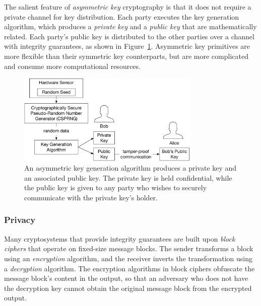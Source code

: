 The salient feature of \textit{asymmetric key} cryptography is that it does not
require a private channel for key distribution. Each party executes the key
generation algorithm, which produces a \textit{private key} and a
\textit{public key} that are mathematically related. Each party's public key
is distributed to the other parties over a channel with integrity guarantees,
as shown in Figure~\ref{fig:asymmetric_key_generation}.
Asymmetric key primitives are more flexible than their symmetric key
counterparts, but are more complicated and consume more computational
resources.

\begin{figure}[hbt]
  \centering
  \includegraphics[width=87mm]{figures/asymmetric_key_generation.pdf}
  \caption{
    An asymmetric key generation algorithm produces a private key and an
    associated public key. The private key is held confidential, while the
    public key is given to any party who wishes to securely communicate with
    the private key's holder.
  }
  \label{fig:asymmetric_key_generation}
\end{figure}


\subsubsection{Privacy}

Many cryptosystems that provide integrity guarantees are built upon
\textit{block ciphers} that operate on fixed-size message blocks. The sender
transforms a block using an \textit{encryption} algorithm, and the receiver
inverts the transformation using a \textit{decryption} algorithm. The
encryption algorithms in block ciphers obfuscate the message block's content in
the output, so that an adversary who does not have the decryption key cannot
obtain the original message block from the encrypted output.


